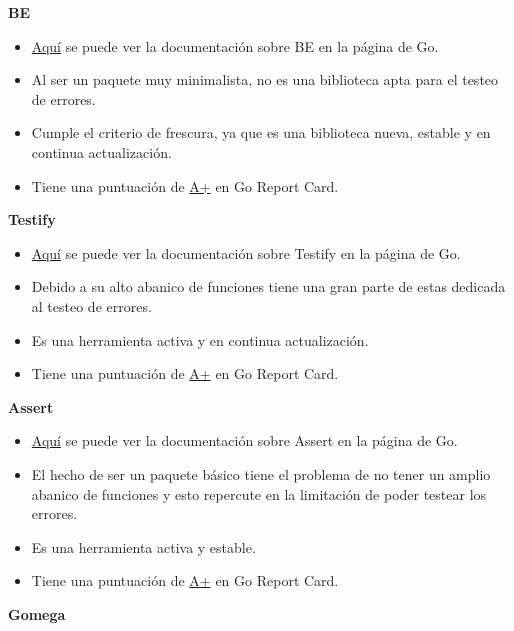 \textbf{BE}

\begin{itemize}
\item
  \href{https://pkg.go.dev/github.com/carlmjohnson/be}{Aquí} se puede
  ver la documentación sobre BE en la página de Go.
\item
  Al ser un paquete muy minimalista, no es una biblioteca apta para el
  testeo de errores.
\item
  Cumple el criterio de frescura, ya que es una biblioteca nueva, estable
  y en continua actualización.
\item
  Tiene una puntuación de
  \href{https://goreportcard.com/report/github.com/carlmjohnson/be}{A+}
  en Go Report Card.
\end{itemize}

\textbf{Testify}

\begin{itemize}
\item
  \href{https://pkg.go.dev/github.com/stretchr/testify}{Aquí} se puede
  ver la documentación sobre Testify en la página de Go.
\item
  Debido a su alto abanico de funciones tiene una gran parte de estas
  dedicada al testeo de errores.
\item
  Es una herramienta activa y en continua actualización.
\item
  Tiene una puntuación de
  \href{https://goreportcard.com/report/github.com/stretchr/testify}{A+}
  en Go Report Card.
\end{itemize}

\textbf{Assert}

\begin{itemize}
\item
  \href{https://pkg.go.dev/gopkg.in/go-playground/assert.v1}{Aquí} se
  puede ver la documentación sobre Assert en la página de Go.
\item
  El hecho de ser un paquete básico tiene el problema de no tener un
  amplio abanico de funciones y esto repercute en la limitación de poder
  testear los errores.
\item
  Es una herramienta activa y estable.
\item
  Tiene una puntuación de
  \href{https://goreportcard.com/report/github.com/go-playground/assert}{A+}
  en Go Report Card.
\end{itemize}

\textbf{Gomega}

